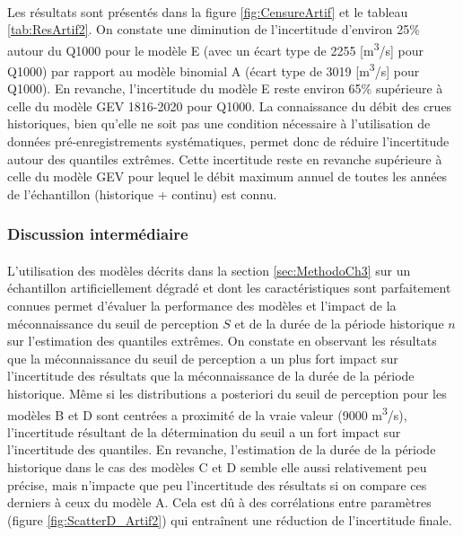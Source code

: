 	\paragraph{}
	Les résultats sont présentés dans la figure \ref{fig:CensureArtif} et le tableau \ref{tab:ResArtif2}. On constate une diminution de l'incertitude d'environ 25\% autour du Q1000 pour le modèle E (avec un écart type de 2255 [m\textsuperscript{3}/s] pour Q1000) par rapport au modèle binomial A (écart type de 3019 [m\textsuperscript{3}/s] pour Q1000). En revanche, l'incertitude du modèle E reste environ 65\% supérieure à celle du modèle GEV 1816-2020 pour Q1000. La connaissance du débit des crues historiques, bien qu'elle ne soit pas une condition nécessaire à l'utilisation de données pré-enregistrements systématiques, permet donc de réduire l'incertitude autour des quantiles extrêmes. Cette incertitude reste en revanche supérieure à celle du modèle GEV pour lequel le débit maximum annuel de toutes les années de l'échantillon (historique + continu) est connu.	

	\subsubsection{Discussion intermédiaire}
	
	\paragraph{} L'utilisation des modèles décrits dans la section \ref{sec:MethodoCh3} sur un échantillon artificiellement dégradé et dont les caractéristiques sont parfaitement connues permet d'évaluer la performance des modèles et l'impact de la méconnaissance du seuil de perception $S$ et de la durée de la période historique $n$ sur l'estimation des quantiles extrêmes. On constate en observant les résultats que la méconnaissance du seuil de perception a un plus fort impact sur l'incertitude des résultats que la méconnaissance de la durée de la période historique. Même si les distributions a posteriori du seuil de perception pour les modèles B et D sont centrées a proximité de la vraie valeur (9000 m\textsuperscript{3}/s), l'incertitude résultant de la détermination du seuil a un fort impact sur l'incertitude des quantiles. En revanche, l'estimation de la durée de la période historique dans le cas des modèles C et D semble elle aussi relativement peu précise, mais n'impacte que peu l'incertitude des résultats si on compare ces derniers à ceux du modèle A. Cela est dû à des corrélations entre paramètres (figure \ref{fig:ScatterD_Artif2}) qui entraînent une réduction de l'incertitude finale.
	 
